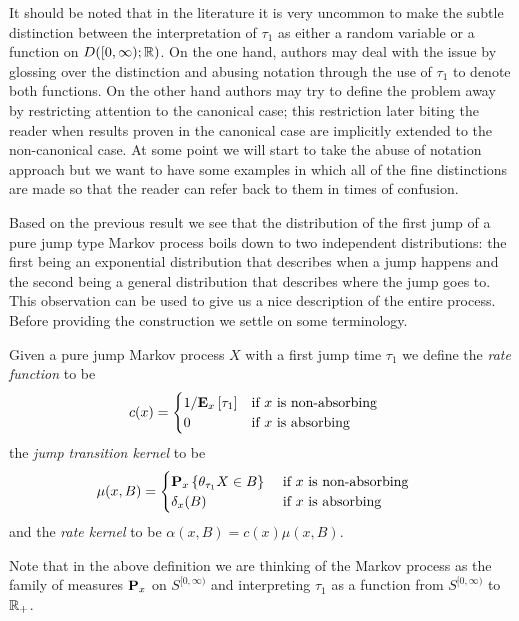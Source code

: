 It should be noted that in the literature it is very uncommon to make
the subtle distinction between the interpretation of $\tau_1$ as
either a random variable or a function on $D([0, \infty); \reals)$.
On the one hand, authors may deal with the issue by glossing over the
distinction and abusing notation through the use of $\tau_1$ to denote
both functions.  On the other hand authors may try to define the
problem away by restricting attention to the canonical case; this
restriction later biting the reader when results proven in the
canonical case are implicitly extended to the non-canonical case.  At
some point we will start to take the abuse of notation approach
but we want to have some examples in which all of the fine
distinctions are made so that the reader can refer back to them in
times of confusion.

Based on the previous result we see that the distribution of the first
jump of a pure
jump type Markov process boils down to two independent distributions:
the first being an exponential distribution that describes when a jump
happens and the second being a general distribution that describes
where the jump goes to.  This observation can be used to give us a
nice description of the entire process.  Before providing the
construction we settle on some terminology.

\begin{defn}Given a pure jump Markov process $X$ with a first jump
  time $\tau_1$ we define the \emph{rate function} to be 
\begin{align*}
c(x) &=\begin{cases}
  1/\sexpectation{\tau_1}{x} & \text{if $x$ is non-absorbing}\\
0 & \text{if $x$ is absorbing}
\end{cases}
\end{align*}
 the \emph{jump transition kernel} to be
 \begin{align*}
\mu(x,B) &= \begin{cases}
\sprobability{\theta_{\tau_1}X \in B}{x} & \text{ if $x$ is non-absorbing} \\
\delta_x(B) & \text{ if $x$ is absorbing}
\end{cases}
\end{align*} 
and the \emph{rate
    kernel} to be $\alpha(x,B) = c(x) \mu(x,B)$.  
\end{defn}
Note that in the above definition we are thinking of the Markov
process as the family of measures $\probabilityop_x$ on
$S^{[0,\infty)}$ and interpreting $\tau_1$ as a
function from $S^{[0,\infty)}$ to $\reals_+$.


